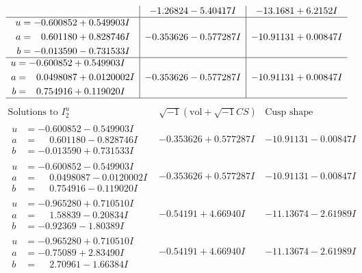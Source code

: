 \documentclass[1p]{elsarticle_modified}
\theoremstyle{definition}
\newcommand{\I}{\sqrt{-1}}
\begin{document}
$$\begin{array}{c|c|c}
 & -1.26824 - 5.40417 I & -13.1681 + 6.2152 I \\ \hline\begin{aligned}
u &= -0.600852 + 0.549903 I \\
a &= \phantom{-}0.601180 + 0.828746 I \\
b &= -0.013590 - 0.731533 I\end{aligned}
 & -0.353626 - 0.577287 I & -10.91131 + 0.00847 I \\ \hline\begin{aligned}
u &= -0.600852 + 0.549903 I \\
a &= \phantom{-}0.0498087 + 0.0120002 I \\
b &= \phantom{-}0.754916 + 0.119020 I\end{aligned}
 & -0.353626 - 0.577287 I & -10.91131 + 0.00847 I\\
 \hline 
 \end{array}$$\newpage$$\begin{array}{c|c|c}  
\text{Solutions to }I^u_{2}& \I (\text{vol} + \sqrt{-1}CS) & \text{Cusp shape}\\
 \hline 
\begin{aligned}
u &= -0.600852 - 0.549903 I \\
a &= \phantom{-}0.601180 - 0.828746 I \\
b &= -0.013590 + 0.731533 I\end{aligned}
 & -0.353626 + 0.577287 I & -10.91131 - 0.00847 I \\ \hline\begin{aligned}
u &= -0.600852 - 0.549903 I \\
a &= \phantom{-}0.0498087 - 0.0120002 I \\
b &= \phantom{-}0.754916 - 0.119020 I\end{aligned}
 & -0.353626 + 0.577287 I & -10.91131 - 0.00847 I \\ \hline\begin{aligned}
u &= -0.965280 + 0.710510 I \\
a &= \phantom{-}1.58839 - 0.20834 I \\
b &= -0.92369 - 1.80389 I\end{aligned}
 & -0.54191 + 4.66940 I & -11.13674 - 2.61989 I \\ \hline\begin{aligned}
u &= -0.965280 + 0.710510 I \\
a &= -0.75089 + 2.83490 I \\
b &= \phantom{-}2.70961 - 1.66384 I\end{aligned}
 & -0.54191 + 4.66940 I & -11.13674 - 2.61989 I \\ \hline\begin{aligned}

\end{aligned}
\end{array}$$
\end{document}
